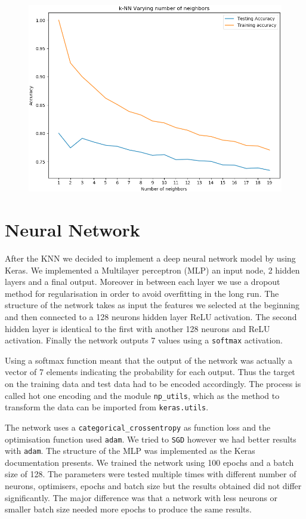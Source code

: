 \documentclass[a4paper, 11pt]{article}
\begin{document}
\begin{figure}
\centering
  \includegraphics[width=1\textwidth]{img/knn_norm}
  \label{knn_norm}
\end{figure}

\section*{Neural Network}
After the KNN we decided to implement a deep neural network model by using Keras. We implemented a Multilayer perceptron (MLP) an input node, 2 hidden layers and a final output. Moreover in between each layer we use a dropout method for regularisation in order to avoid overfitting in the long run. The structure of the network takes as input the features we selected at the beginning and then connected to a 128 neurons hidden layer ReLU activation. The second hidden layer is identical to the first with another 128 neurons and ReLU activation. Finally the network outputs 7 values using a \texttt{softmax} activation.

Using a softmax function meant that the output of the network was actually a vector of 7 elements indicating the probability for each output. Thus the target on the training data and test data had to be encoded accordingly. The process is called hot one encoding and the module \texttt{np\_utils}, which as the method to transform the data can be imported from \texttt{keras.utils}.

The network uses a \texttt{categorical\_crossentropy} as function loss and the optimisation function used \texttt{adam}. We tried to \texttt{SGD} however we had better results with \texttt{adam}. The structure of the MLP was implemented as the Keras documentation presents. We trained the network using 100 epochs and a batch size of 128. The parameters were tested multiple times with different number of neurons, optimisers, epochs and batch size but the results obtained did not differ significantly. The major difference was that a network with less neurons or smaller batch size needed more epochs to produce the same results.
\end{document}
